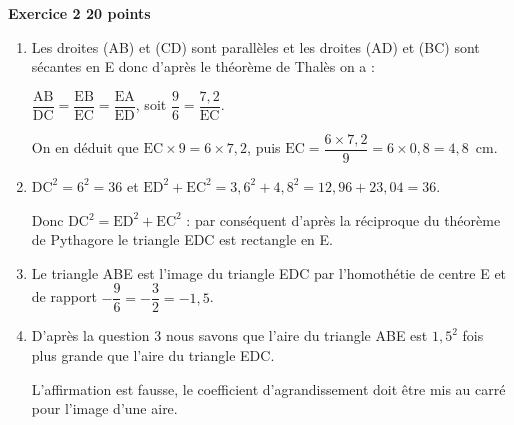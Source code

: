 \textbf{\large Exercice 2 \hfill 20 points}

\medskip

\begin{enumerate}
\item Les droites (AB) et (CD) sont parallèles et les droites (AD) et (BC) sont sécantes en E donc d'après le théorème de Thalès on a :

$\dfrac{\text{AB}}{\text{DC}} = \dfrac{\text{EB}}{\text{EC}} = \dfrac{\text{EA}}{\text{ED}}$, soit $\dfrac{9}{6}  = \dfrac{7,2}{\text{EC}}$.

On en déduit que $\text{EC}\times 9 = 6 \times 7,2$, puis $\text{EC} = \dfrac{6 \times 7,2}{9} = 6 \times 0,8 = 4,8$~cm.
\item $\text{DC}^2 = 6^2= 36$ et $\text{ED}^2 + \text{EC}^2 = 3,6^2+ 4,8^2 = 12,96 + 23,04 = 36$.

Donc DC$^2 = \text{ED}^2 +\text{EC}^2$ : par conséquent d'après la réciproque du théorème de Pythagore le triangle EDC est rectangle en E.
\item Le triangle ABE est l'image du triangle EDC par l'homothétie de centre E et de
rapport $-\dfrac{9}{6} = - \dfrac32 = - 1,5$.
\item D'après la question 3 nous savons que l'aire du triangle ABE est $1,5^2$ fois plus grande que l'aire du triangle EDC.

L'affirmation est fausse, le coefficient d'agrandissement doit être mis au carré pour l'image d'une aire.
\end{enumerate}

\bigskip

